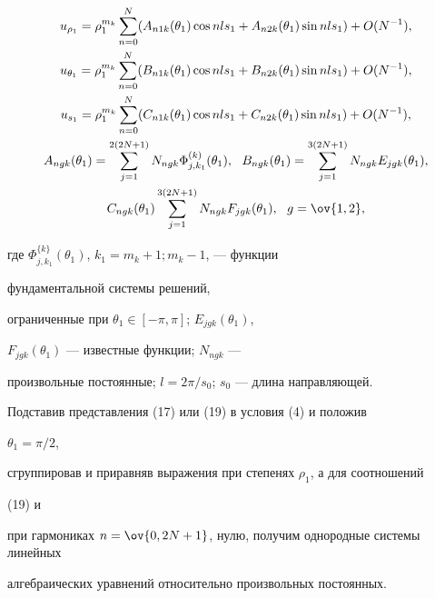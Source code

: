 \begin{gather} 


u_{\rho_1}=\rho^{m_k}_1\sum^N_{n=0}(A_{n1k}(\theta_1) 


\cos nls_1+A_{n2k}(\theta_1)\sin nls_1)+O(N^{-1}),\notag\\ 


% 


u_{\theta_1}=\rho^{m_k}_1\sum^N_{n=0}(B_{n1k}(\theta_1)\cos nls_1 


+B_{n2k}(\theta_1)\sin nls_1)+O(N^{-1}),\notag \\ 


% 


u_{s_1}=\rho^{m_k}_1\sum^N_{n=0}(C_{n1k}(\theta_1) 


\cos nls_1+C_{n2k}(\theta_1)\sin nls_1)+O(N^{-1}), \\ 


% 


A_{ngk}(\theta_1)=\sum^{2(2N+1)}_{j=1}N_{ngk} 


\Phi^{(k)}_{j,k_1}(\theta_1),\ \ 


B_{ngk}(\theta_1)=\sum^{3(2N+1)}_{j=1}N_{ngk}E_{jgk}(\theta_1),\notag \\  


C_{ngk}(\theta_1)\sum^{3(2N+1)}_{j=1}N_{ngk}F_{jgk}(\theta_1), 


\ \ g=\ov{1,2}, \notag


\end{gather} 


где $\Phi^{\{k\}}_{j,k_1}(\theta_1)$, $k_1=m_k+1;m_k-1$, --- функции 


фундаментальной системы решений,  


ограниченные при $\theta_1\in[-\pi,\pi]$; $E_{jgk}(\theta_1)$, 


$F_{jgk}(\theta_1)$ --- известные функции; $N_{ngk}$ --- 


произвольные постоянные; $l=2\pi/s_0$; $s_0$ --- длина направляющей. 


 


Подставив представления (17) или (19) в условия (4) и положив 


$\theta_1=\pi/2$,  


сгруппировав и приравняв выражения при степенях $\rho_1$, а для соотношений 


(19) и  


при гармониках $n=\ov{0,2N+1}$, нулю, получим однородные системы линейных  


алгебраических уравнений относительно произвольных постоянных.  


